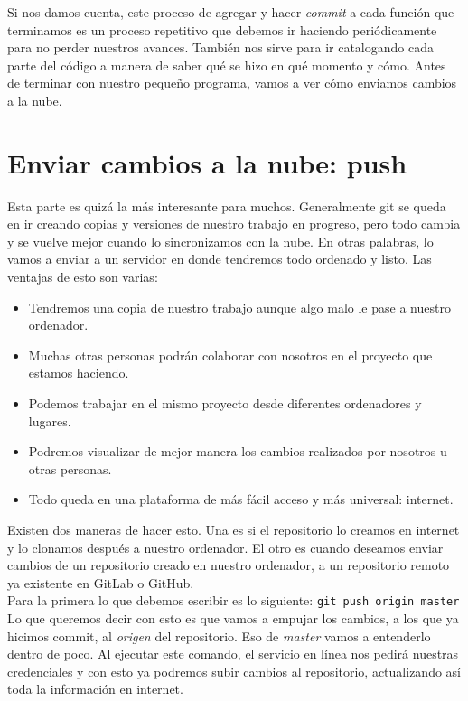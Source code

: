 \documentclass[10pt,letterpaper]{article}
\newcommand{\inlinecode}[1]{
\colorbox{light-gray}{\texttt{#1}}
}
\begin{document}
Si nos damos cuenta, este proceso de agregar y hacer \emph{commit} a cada funci\'on que terminamos es un proceso repetitivo que debemos ir haciendo peri\'odicamente para no perder nuestros avances. Tambi\'en nos sirve para ir catalogando cada parte del c\'odigo a manera de saber qu\'e se hizo en qu\'e momento y c\'omo. Antes de terminar con nuestro peque\~no programa, vamos a ver c\'omo enviamos cambios a la nube.

\section{Enviar cambios a la nube: push}
Esta parte es quiz\'a la m\'as interesante para muchos. Generalmente git se queda en ir creando copias y versiones de nuestro trabajo en progreso, pero todo cambia y se vuelve mejor cuando lo sincronizamos con la nube. En otras palabras, lo vamos a enviar a un servidor en donde tendremos todo ordenado y listo. Las ventajas de esto son varias:

\begin{itemize}
\item Tendremos una copia de nuestro trabajo aunque algo malo le pase a nuestro ordenador.
\item Muchas otras personas podr\'an colaborar con nosotros en el proyecto que estamos haciendo.
\item Podemos trabajar en el mismo proyecto desde diferentes ordenadores y lugares.
\item Podremos visualizar de mejor manera los cambios realizados por nosotros u otras personas.
\item Todo queda en una plataforma de m\'as f\'acil acceso y m\'as universal: internet.
\end{itemize}

Existen dos maneras de hacer esto. Una es si el repositorio lo creamos en internet y lo clonamos despu\'es a nuestro ordenador. El otro es cuando deseamos enviar cambios de un repositorio creado en nuestro ordenador, a un repositorio remoto ya existente en GitLab o GitHub.\\

Para la primera lo que debemos escribir es lo siguiente: \inlinecode{git push origin master} Lo que queremos decir con esto es que vamos a empujar los cambios, a los que ya hicimos commit, al \emph{origen} del repositorio. Eso de \emph{master} vamos a entenderlo dentro de poco. Al ejecutar este comando, el servicio en l\'inea nos pedir\'a nuestras credenciales y con esto ya podremos subir cambios al repositorio, actualizando as\'i toda la informaci\'on en internet.\\
\end{document}
